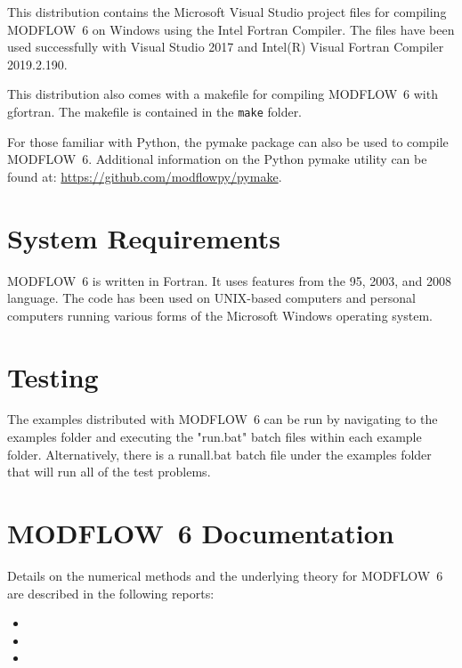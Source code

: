 \documentclass[11pt,twoside,twocolumn]{usgsreport}
\begin{document}
This distribution contains the Microsoft Visual Studio project files for compiling MODFLOW~6 on Windows using the Intel Fortran Compiler.  The files have been used successfully with Visual Studio 2017 and Intel(R) Visual Fortran Compiler 2019.2.190.

This distribution also comes with a makefile for compiling MODFLOW~6 with gfortran.  The makefile is contained in the \texttt{make} folder.

For those familiar with Python, the pymake package can also be used to compile MODFLOW~6.  Additional information on the Python pymake utility can be found at: \url{https://github.com/modflowpy/pymake}.  

\section{System Requirements}
MODFLOW~6 is written in Fortran.  It uses features from the 95, 2003, and 2008 language.  The code has been used on UNIX-based computers and personal computers running various forms of the Microsoft Windows operating system.

\section{Testing}
The examples distributed with MODFLOW~6 can be run by navigating to the examples folder and executing the "run.bat" batch files within each example folder.  Alternatively, there is a runall.bat batch file under the examples folder that will run all of the test problems.

\section{MODFLOW~6 Documentation}
Details on the numerical methods and the underlying theory for MODFLOW~6 are described in the following reports:

\begin{itemize}

\item {}

\item {}

\item {}

\end{itemize}
 
\end{document}
